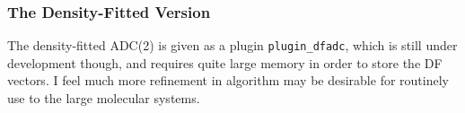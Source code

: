 \subsubsection{The Density-Fitted Version}
The density-fitted ADC(2) is given as a plugin \verb|plugin_dfadc|, which is still under development though, and requires quite large memory in order to store the DF vectors. I feel much more refinement in algorithm may be desirable for routinely use to the large molecular systems.